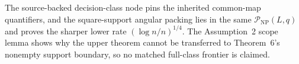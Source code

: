 The source-backed decision-class node pins the inherited common-map quantifiers, and the square-support angular packing lies in the same \(\mathcal P_{\mathrm{NP}}(L,q)\) and proves the sharper lower rate \((\log n/n)^{1/4}\).  The Assumption~2 scope lemma shows why the upper theorem cannot be transferred to Theorem~6's nonempty support boundary, so no matched full-class frontier is claimed.